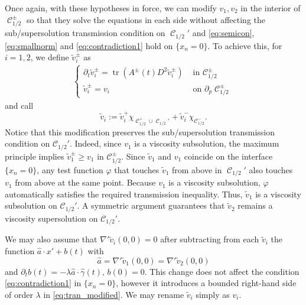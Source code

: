 \documentclass[12pt]{article}
\makeatletter
\newenvironment{customproof}[1]{%
  \par\pushQED{\qed}%
  \normalfont\topsep6pt \trivlist
  \item[\hskip\labelsep\itshape
    Proof of #1\@addpunct{.}]\ignorespaces
}{%
  \popQED\endtrivlist\@endpefalse
}
\numberwithin{Theorem}{section}
\theoremstyle{definition}
\theoremstyle{remark}
\numberwithin{equation}{section}
\DeclareMathOperator{\C}{\mathcal{C}}
\DeclareMathOperator*{\tr}{tr}
\newcommand{\p}{\partial}
\makeatother
\begin{document}
\begin{customproof}{Theorem \ref{Thm:CP}}
     Once again, with these hypotheses in force, we can modify $v_1,v_2$ in the interior of $\C_{1/2}^\pm$ so that they solve the equations in each side without affecting the sub/supersolution transmission condition on $\C_{1/2}'$ and \eqref{eq:semicon}, \eqref{eq:smallnorm} and \eqref{eq:contradiction1} hold on $\{ x_n=0\}$.
     To achieve this, for $i=1,2$, we define $\tilde v_i^\pm$ as 
     \begin{equation} \label{eq:tran_modified}
         \begin{aligned}
        \begin{cases}
            \p_t \tilde v_i^\pm = \tr(A^\pm(t)D^2 \tilde v_i^\pm) & \text{ in }\C_{1/2}^\pm \\
            \tilde v_i^\pm = v_i &\text{ on }\p_p \C_{1/2}^\pm
        \end{cases}
    \end{aligned}
    \end{equation}
    and call 
    \[
    \tilde v_i := \tilde v_i^+ \chi_{ \C_{1/2}^+ \cup \C_{1/2}'} + \tilde v_i^- \chi_{ \C_{1/2}^-}.
    \] 
    Notice that this modification preserves the sub/supersolution transmission condition on $\mathcal{C}_{1/2}'$. Indeed, since $v_1$ is a viscosity subsolution, the maximum principle implies $\tilde v_1^\pm \ge v_1$ in $\mathcal{C}_{1/2}^\pm$. Since $\tilde v_1$ and $v_1$ coincide on the interface $\{x_n = 0\}$, any test function $\varphi$ that touches $\tilde v_1$ from above in $\C_{1/2}'$ also touches $v_1$ from above at the same point. Because $v_1$ is a viscosity subsolution, $\varphi$ automatically satisfies the required transmission inequality. Thus, $\tilde v_1$ is a viscosity subsolution on $\mathcal{C}_{1/2}'$. A symmetric argument guarantees that $\tilde v_2$ remains a viscosity supersolution on $\mathcal{C}_{1/2}'$.
    
    We may also assume that $\nabla' \tilde v_i (0,0) = 0$ after subtracting from each $\tilde v_i$ the function $\hat a \cdot x' + b(t)$ with
    \[
    \hat a=\nabla' \tilde v_1 (0,0)=\nabla' \tilde v_2 (0,0)
    \]
    and  $\p_t b(t)=- \lambda  \hat a \cdot \hat \gamma (t), \, b(0)=0$. This change does not affect the condition \eqref{eq:contradiction1} in $\{x_n=0 \}$, however it introduces a bounded right-hand side of order $\lambda$ in \eqref{eq:tran_modified}. We may rename $\tilde v_i$ simply as $v_i$.
    
    

   
   




\end{customproof}
\end{document}
